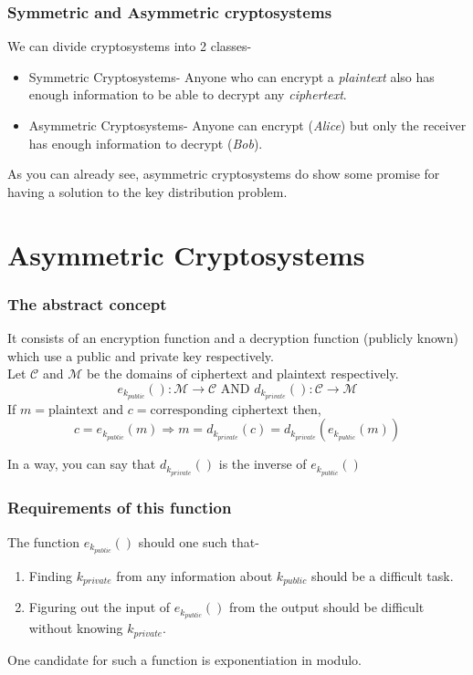 \documentclass[11pt]{beamer}
\begin{document}
  \begin{frame}
    \frametitle{Symmetric and Asymmetric cryptosystems}
    We can divide cryptosystems into 2 classes-
    \begin{itemize}
      \item<1->Symmetric Cryptosystems- Anyone who can encrypt a \emph{plaintext} also has enough information to be able to decrypt any \emph{ciphertext}.
      \item<2->Asymmetric Cryptosystems- Anyone can encrypt (\emph{Alice}) but only the receiver has enough information to decrypt (\emph{Bob}).
    \end{itemize}
    \pause
    As you can already see, asymmetric cryptosystems do show some promise for having a solution to the key distribution problem.

  \end{frame}

\section{Asymmetric Cryptosystems}
  \begin{frame}
    \frametitle{The abstract concept}
    It consists of an encryption function and a decryption function (publicly known) which use a public and private key respectively.\\\pause
    Let \(\mathcal{C}\) and \(\mathcal{M}\) be the domains of ciphertext and plaintext respectively.
    \[e_{k_{public}}():\mathcal{M}\rightarrow \mathcal{C}\text{ AND } d_{k_{private}}():\mathcal{C}\rightarrow \mathcal{M}\]\pause
    If \(m=\text{plaintext}\) and \(c=\text{corresponding ciphertext}\) then,
    \[c=e_{k_{public}}(m)\Rightarrow m=d_{k_{private}}(c)=d_{k_{private}}(e_{k_{public}}(m))\]\pause
    \begin{block}{}
      In a way, you can say that \(d_{k_{private}}()\) is the \alert{inverse} of \(e_{k_{public}}()\)
    \end{block}

  \end{frame}

  \begin{frame}
    \frametitle{Requirements of this function}
    The function \(e_{k_{public}}()\) should one such that-
    \begin{enumerate}
      \item<1-> Finding \(k_{private}\) from any information about \(k_{public}\) should be a difficult task.
      \item<2-> Figuring out the input of \(e_{k_{public}}()\) from the output should be difficult without knowing \(k_{private}\).
    \end{enumerate}\pause
    One candidate for such a function is exponentiation in modulo.
  \end{frame}
\end{document}
